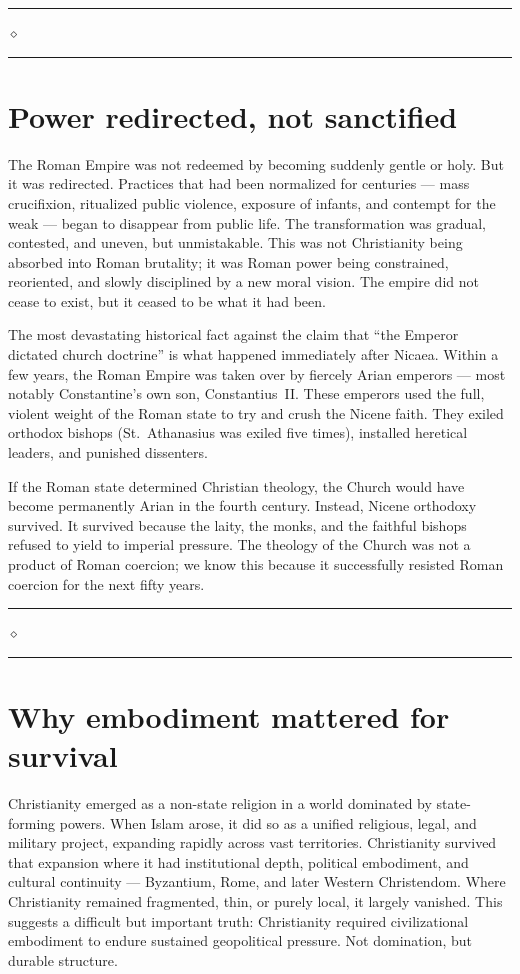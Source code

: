 \documentclass[10pt,twoside,openany]{book}
\newcommand{\ornrule}{%
  \par\bigskip
  {\noindent\hfil{\color{gold}\rule[0.5ex]{1.5in}{0.5pt}%
  \quad$\diamond$\quad%
  \rule[0.5ex]{1.5in}{0.5pt}}\hfil\par}%
  \bigskip
}
\begin{document}
\ornrule



\section{Power redirected, not sanctified}

The Roman Empire was not redeemed by becoming suddenly gentle or holy.
But it was redirected. Practices that had been normalized for
centuries --- mass crucifixion, ritualized public violence, exposure of
infants, and contempt for the weak --- began to disappear from public
life. The transformation was gradual, contested, and uneven, but
unmistakable. This was not Christianity being absorbed into Roman
brutality; it was Roman power being constrained, reoriented, and slowly
disciplined by a new moral vision. The empire did not cease to exist,
but it ceased to be what it had been.

The most devastating historical fact against the claim that ``the
Emperor dictated church doctrine'' is what happened immediately after
Nicaea. Within a few years, the Roman Empire was taken over by
fiercely Arian emperors --- most notably Constantine's own son,
Constantius~II. These emperors used the full, violent weight of the
Roman state to try and crush the Nicene faith. They exiled orthodox
bishops (St.\ Athanasius was exiled five times), installed heretical
leaders, and punished dissenters.

If the Roman state determined Christian theology, the Church would
have become permanently Arian in the fourth century. Instead, Nicene
orthodoxy survived. It survived because the laity, the monks, and the
faithful bishops refused to yield to imperial pressure. The theology
of the Church was not a product of Roman coercion; we know this
because it successfully resisted Roman coercion for the next fifty
years.

\ornrule



\section{Why embodiment mattered for survival}

Christianity emerged as a non-state religion in a world dominated by
state-forming powers. When Islam arose, it did so as a unified
religious, legal, and military project, expanding rapidly across vast
territories. Christianity survived that expansion where it had
institutional depth, political embodiment, and cultural
continuity --- Byzantium, Rome, and later Western Christendom. Where
Christianity remained fragmented, thin, or purely local, it largely
vanished. This suggests a difficult but important truth: Christianity
required civilizational embodiment to endure sustained geopolitical
pressure. Not domination, but durable structure.
\end{document}
